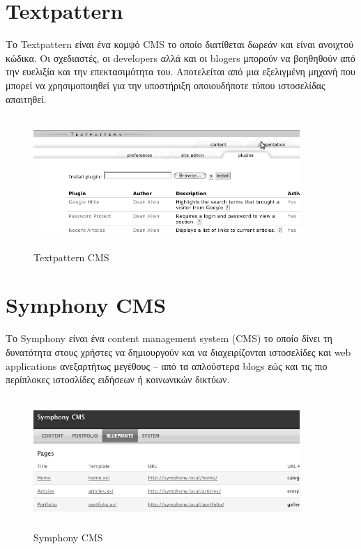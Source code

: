 \documentclass[12pt]{report}
\begin{document}
\section{\textlatin{Textpattern}}
Το \textlatin{Textpattern} είναι ένα κομψό \textlatin{CMS} το οποίο διατίθεται δωρεάν και είναι ανοιχτού κώδικα. Οι σχεδιαστές, οι \textlatin{developers} αλλά και οι \textlatin{blogers} μπορούν να βοηθηθούν από την ευελιξία και την επεκτασιμότητα του. Αποτελείται από μια εξελιγμένη μηχανή που μπορεί να χρησιμοποιηθεί για την υποστήριξη οποιουδήποτε τύπου ιστοσελίδας απαιτηθεί.
\begin{figure}[H]
\centering
\includegraphics[width=0.9\textwidth, height=5cm]{Textpattern-gray}
\caption{\textlatin{Textpattern CMS}}
\label{fig:text_patrn}
\end{figure}

\section{\textlatin{Symphony CMS}}
Το \textlatin{Symphony} είναι ένα \textlatin{content management system (CMS)} το οποίο δίνει τη δυνατότητα στους χρήστες να δημιουργούν και να διαχειρίζονται ιστοσελίδες και \textlatin{web applications} ανεξαρτήτως μεγέθους – από τα απλούστερα \textlatin{blogs} εώς και τις πιο περίπλοκες ιστοσλίδες ειδήσεων ή κοινωνικών δικτύων.
\begin{figure}[H]
\centering
\includegraphics[width=0.9\textwidth, height=5cm]{symphony_cms-gray}
\caption{\textlatin{Symphony CMS}}
\label{fig:symphony_cms}
\end{figure}
\end{document}
